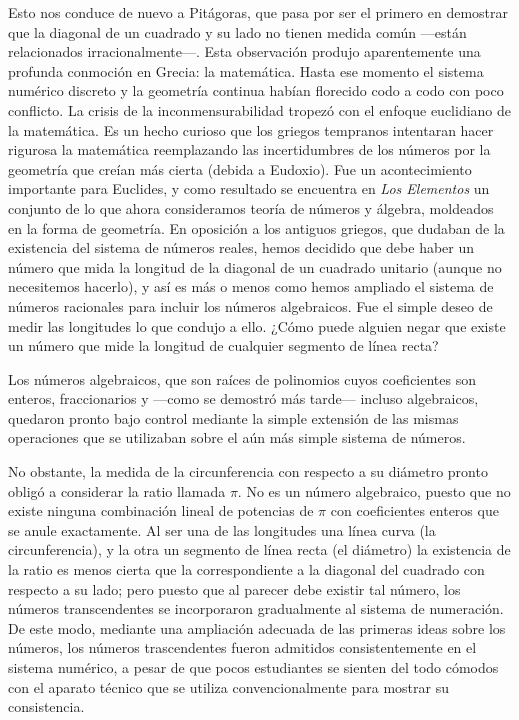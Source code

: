 \documentclass[a4paper, 12pt]{article}
\begin{document}
 

Esto nos conduce de nuevo a Pitágoras, que pasa por ser el primero en demostrar que la diagonal de un cuadrado y su lado no tienen medida común ---están relacionados irracionalmente---. Esta observación produjo aparentemente una profunda conmoción en Grecia: la matemática. Hasta ese momento el sistema numérico discreto y la geometría continua habían florecido codo a codo con poco conflicto. La crisis de la inconmensurabilidad tropezó con el enfoque euclidiano de la matemática. Es un hecho curioso que los griegos tempranos intentaran hacer rigurosa la matemática reemplazando las incertidumbres de los números por la geometría que creían más cierta (debida a Eudoxio). Fue un acontecimiento importante para Euclides, y como resultado se encuentra en {\it Los Elementos}  un conjunto de lo que ahora consideramos teoría de números y álgebra, moldeados en la forma de geometría. En oposición a los antiguos griegos, que dudaban de la existencia del sistema de números reales, hemos decidido que debe haber un número que mida la longitud de la diagonal de un cuadrado unitario (aunque no necesitemos hacerlo), y así es más o menos como hemos ampliado el sistema de números racionales para incluir los números algebraicos. Fue el simple deseo de medir las longitudes lo que condujo a ello. ¿Cómo puede alguien negar que existe un número que mide la longitud de cualquier segmento de línea recta?

 

Los números algebraicos, que son raíces de polinomios cuyos coeficientes son enteros, fraccionarios y ---como se demostró más tarde--- incluso algebraicos, quedaron pronto bajo control mediante la simple extensión de las mismas operaciones que se utilizaban sobre el aún más simple sistema de números.

 

No obstante, la medida de la circunferencia con respecto a su diámetro pronto obligó a considerar la ratio llamada $\pi$. No es un número algebraico, puesto que no existe ninguna combinación lineal de potencias de $\pi$ con coeficientes enteros que se anule exactamente. Al ser una de las longitudes una línea curva (la circunferencia), y la otra un segmento de línea recta (el diámetro) la existencia de la ratio es menos cierta que la correspondiente a la diagonal del cuadrado con respecto a su lado; pero puesto que al parecer debe existir tal número, los números transcendentes se incorporaron gradualmente al sistema de numeración. De este modo, mediante una ampliación adecuada de las primeras ideas sobre los números, los números trascendentes fueron admitidos consistentemente en el sistema numérico, a pesar de que pocos estudiantes se sienten del todo cómodos con el aparato técnico que se utiliza convencionalmente para mostrar su consistencia.
\end{document}
